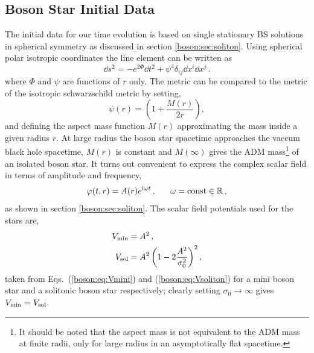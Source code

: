 \subsection{Boson Star Initial Data}
%
The initial data for our time evolution is based on single stationary
BS solutions in spherical symmetry as discussed in section \ref{boson:sec:soliton}.
Using spherical polar isotropic coordinates the
line element can be written as
%
\begin{equation}
  \dd s^2 =
  -e^{2\Phi} \dd t^2
  + \psi^4 \delta_{ij} \dd x^i \dd x^j\,.
  \label{mal:eq:ds2sym}
\end{equation}
%
where $\Phi$ and $\psi$ are functions of $r$ only. The metric can be compared to
the metric of the isotropic schwarzschild metric by setting,
\begin{equation}
\psi(r) = \left(1+\frac{M(r)}{2 r} \right) \label{malaise:eq:aspect_mass_def},
\end{equation}
and defining the aspect mass function $M(r)$ approximating the mass inside a given
radius $r$. At large radius the boson star spacetime approaches the vaccum black
hole spacetime, $M(r)$ is constant and $M(\infty)$ gives the
ADM mass\footnote{It should be noted that the aspect mass is not equivalent to
the ADM mass at finite radii, only for large radius in an asymptotically flat spacetime.}
of an isolated boson star.
It turns out convenient to express the complex
scalar field in terms of amplitude and frequency,
%
\begin{equation}
  \varphi(t,r) =
  A(r)
  e^{{\rm i} \omega t}\,,~~~~~\omega = \mathrm{const}\in \mathbb{R}\,,
\end{equation}
as shown in section \ref{boson:sec:soliton}. The scalar field potentials used for the stars are,
\begin{align}
  {V}_{\rm min} &= {A}^2\,,~~~~~~~~~~ \label{mal:eq:Vmini} \\
  {V}_{\rm sol} &= {A}^2 \left( 1-2\frac{{A}^2}{{\sigma}_0^2} \right)^2, \label{mal:eq:Vsoliton}
\end{align}
taken from Eqs.~(\ref{boson:eq:Vmini}) and (\ref{boson:eq:Vsoliton}) for a mini boson star and a solitonic boson star respectively; clearly setting $\sigma_0 \rightarrow \infty$ gives $V_{\rm min} = V_{\rm sol}$.



